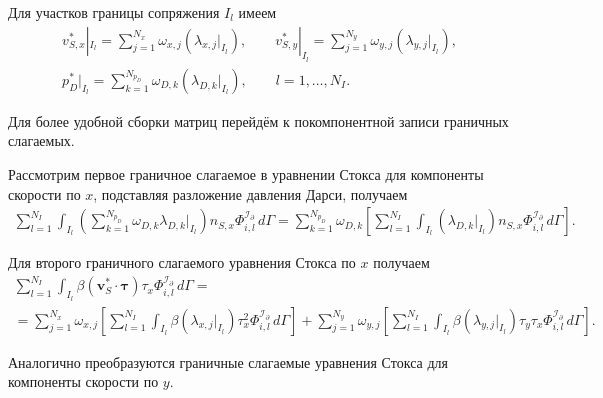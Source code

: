 \documentclass[a4paper,14pt]{extarticle}
\begin{document}
Для участков границы сопряжения $I_l$ имеем
\begin{equation}
	\begin{gathered}
		v_{S,x}^*|_{I_l}
		=
		\sum_{j=1}^{N_x}
		\omega_{x,j}
		\left(\lambda_{x,j}|_{I_l}\right),
		\qquad
		v_{S,y}^*|_{I_l}
		=
		\sum_{j=1}^{N_y}
		\omega_{y,j}
		\left(\lambda_{y,j}|_{I_l}\right),
		\\[6pt]
		p_D^*|_{I_l}
		=
		\sum_{k=1}^{N_{p_D}}
		\omega_{D,k}
		\left(\lambda_{D,k}|_{I_l}\right),
		\qquad l=1,\ldots,N_I.
	\end{gathered}
\end{equation}


Для более удобной сборки матриц перейдём к покомпонентной
записи граничных слагаемых.

Рассмотрим первое граничное слагаемое в уравнении Стокса
для компоненты скорости по $x$, подставляя разложение
давления Дарси, получаем
\begin{equation}
	\begin{gathered}
		\sum_{l=1}^{N_I}
		\int_{I_l}
		\left(
			\sum_{k=1}^{N_{p_D}}
			\omega_{D,k}\lambda_{D,k}|_{I_l}
		\right)
		n_{S,x}\Phi^{\mathcal I_\partial}_{i,l}
		\,d\Gamma
		=
		\sum_{k=1}^{N_{p_D}}
		\omega_{D,k}
		\left[
			\sum_{l=1}^{N_I}
			\int_{I_l}
			\left(\lambda_{D,k}|_{I_l}\right)
			n_{S,x}\Phi^{\mathcal I_\partial}_{i,l}
			\,d\Gamma
		\right].
	\end{gathered}
\end{equation}

Для второго граничного слагаемого уравнения Стокса
по $x$ получаем
\begin{equation}
	\begin{gathered}
		\sum_{l=1}^{N_I}
		\int_{I_l}
		\beta(\mathbf v_S^*\cdot\boldsymbol\tau)
		\tau_x\Phi^{\mathcal I_\partial}_{i,l}
		\,d\Gamma
		=
		\\[6pt]
		=
		\sum_{j=1}^{N_x}
		\omega_{x,j}
		\left[
			\sum_{l=1}^{N_I}
			\int_{I_l}
			\beta
			\left(\lambda_{x,j}|_{I_l}\right)
			\tau_x^2
			\Phi^{\mathcal I_\partial}_{i,l}
			\,d\Gamma
		\right]
		+
		\sum_{j=1}^{N_y}
		\omega_{y,j}
		\left[
			\sum_{l=1}^{N_I}
			\int_{I_l}
			\beta
			\left(\lambda_{y,j}|_{I_l}\right)
			\tau_y\tau_x
			\Phi^{\mathcal I_\partial}_{i,l}
			\,d\Gamma
		\right].
	\end{gathered}
\end{equation}

Аналогично преобразуются граничные слагаемые уравнения
Стокса для компоненты скорости по $y$.
\end{document}

